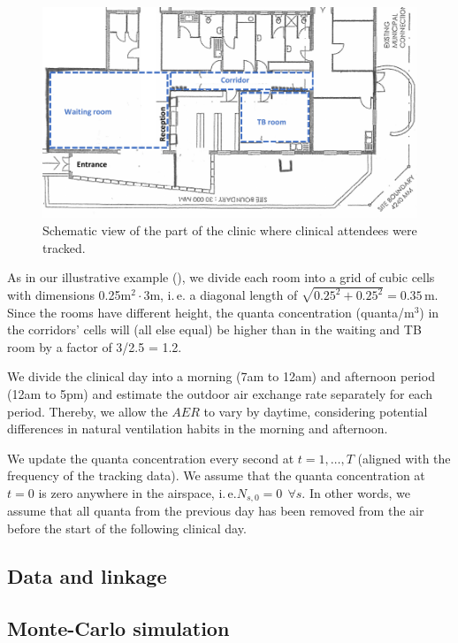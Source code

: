 \documentclass[fleqn,11pt]{wlscirep_supp}
\newcommand\ie{i.\,e.\xspace}
\begin{document}
\begin{figure}[!htpb]
    \centering
    \includegraphics{doc/clinic-schematic-annotated-view.pdf}
    \caption{Schematic view of the part of the clinic where clinical attendees were tracked.}
    \label{fig:clinic}
\end{figure}

As in our illustrative example (), we divide each room into a grid of cubic cells with dimensions 0.25m$^2 \cdot 3$m, \ie a diagonal length of $\sqrt{0.25^2 + 0.25^2} = 0.35$\,m. Since the rooms have different height, the quanta concentration (quanta/m$^3$) in the corridors' cells will (all else equal) be higher than in the waiting and TB room by a factor of 3/2.5 = 1.2. 

We divide the clinical day into a morning (7am to 12am) and afternoon period (12am to 5pm) and estimate the outdoor air exchange rate separately for each period. Thereby, we allow the $AER$ to vary by daytime, considering potential differences in natural ventilation habits in the morning and afternoon. 

We update the quanta concentration every second at $t = 1, \dots, T$ (aligned with the frequency of the tracking data). We assume that the quanta concentration at $t=0$ is zero anywhere in the airspace, \ie $N_{s,0} = 0 ~~ \forall s$. In other words, we assume that all quanta from the previous day has been removed from the air before the start of the following clinical day. 

\subsection{Data and linkage}



\subsection{Monte-Carlo simulation}
\end{document}
